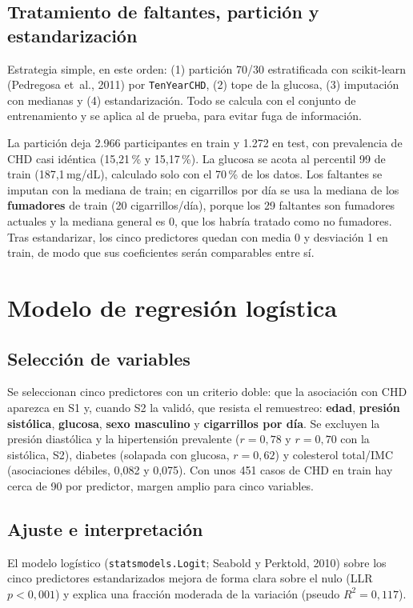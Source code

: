 \documentclass[11pt,a4paper]{article}
\begin{document}
\subsection{Tratamiento de faltantes, partición y estandarización}
Estrategia simple, en este orden: (1) partición 70/30 estratificada con scikit-learn (Pedregosa et~al., 2011) por \texttt{TenYearCHD}, (2) tope de la glucosa, (3) imputación con medianas y (4) estandarización. Todo se calcula con el conjunto de entrenamiento y se aplica al de prueba, para evitar fuga de información.

La partición deja 2.966 participantes en train y 1.272 en test, con prevalencia de CHD casi idéntica (15,21\,\% y 15,17\,\%). La glucosa se acota al percentil 99 de train (187,1\,mg/dL), calculado solo con el 70\,\% de los datos. Los faltantes se imputan con la mediana de train; en cigarrillos por día se usa la mediana de los \textbf{fumadores} de train (20 cigarrillos/día), porque los 29 faltantes son fumadores actuales y la mediana general es 0, que los habría tratado como no fumadores. Tras estandarizar, los cinco predictores quedan con media 0 y desviación 1 en train, de modo que sus coeficientes serán comparables entre sí.

\section{Modelo de regresión logística}
\subsection{Selección de variables}
Se seleccionan cinco predictores con un criterio doble: que la asociación con CHD aparezca en S1 y, cuando S2 la validó, que resista el remuestreo: \textbf{edad}, \textbf{presión sistólica}, \textbf{glucosa}, \textbf{sexo masculino} y \textbf{cigarrillos por día}. Se excluyen la presión diastólica y la hipertensión prevalente ($r=0,78$ y $r=0,70$ con la sistólica, S2), diabetes (solapada con glucosa, $r=0,62$) y colesterol total/IMC (asociaciones débiles, 0,082 y 0,075). Con unos 451 casos de CHD en train hay cerca de 90 por predictor, margen amplio para cinco variables.

\subsection{Ajuste e interpretación}
El modelo logístico (\texttt{statsmodels.Logit}; Seabold y Perktold, 2010) sobre los cinco predictores estandarizados mejora de forma clara sobre el nulo (LLR $p<0,001$) y explica una fracción moderada de la variación (pseudo $R^2=0,117$).
\end{document}
